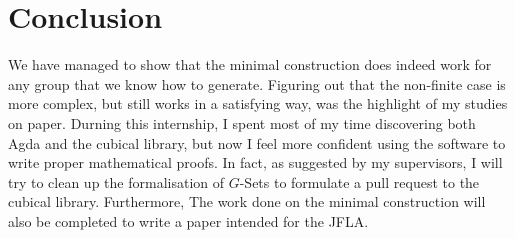 \documentclass{article}
\begin{document}
 \section{Conclusion}

 We have managed to show that the minimal construction does indeed work for any group that we know how to generate. Figuring out that the non-finite case is more complex, but still works in a satisfying way, was the highlight of my studies on paper. Durning this internship, I spent most of my time discovering both Agda and the cubical library, but now I feel more confident using the software to write proper mathematical proofs. In fact, as suggested by my supervisors, I will try to clean up the formalisation of $G$-Sets to formulate a pull request to the cubical library. Furthermore, The work done on the minimal construction will also be completed to write a paper intended for the JFLA.
\end{document}
